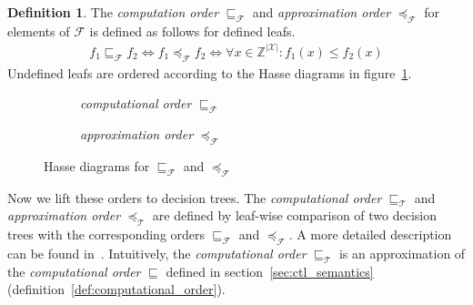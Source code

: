 \documentclass[11pt,a4paper,titlepage]{article}
\theoremstyle{definition}
\newtheorem{definition}{Definition}[section]
\begin{document}
\begin{definition}\label{def:fun_comp_approx_order}
    The \textit{computation order} $\sqsubseteq_{\mathcal{F}}$ and \textit{approximation order} $\preceq_{\mathcal{F}}$
    for elements of $\mathcal{F}$ is defined as follows for defined leafs.
    \begin{align*}
        f_1 \sqsubseteq_{\mathcal{F}} f_2  \iff  f_1 \preceq_{\mathcal{F}} f_2 \iff
        \forall x \in \mathbb{Z}^{|\mathcal{X}|} \colon f_1(x) \leq f_2(x)
    \end{align*}
    Undefined leafs are ordered according to the Hasse diagrams in figure~\ref{fig:function_comp_approx_hasse}. 
\end{definition}


\begin{figure}
    \begin{subfigure}[b]{0.5\textwidth}
        \centering
        \caption{\textit{computational order} $\sqsubseteq_{\mathcal{F}}$}
    \end{subfigure}
    \begin{subfigure}[b]{0.5\textwidth}
        \centering
        \caption{\textit{approximation order} $\preceq_{\mathcal{F}}$}
    \end{subfigure}
    \caption{Hasse diagrams for $\sqsubseteq_{\mathcal{F}}$ and $\preceq_{\mathcal{F}}$
    } 
    \label{fig:function_comp_approx_hasse}
\end{figure}

Now we lift these orders to decision trees. The \textit{computational order} $\sqsubseteq_{\mathcal{T}}$ 
and \textit{approximation order} $\preceq_{\mathcal{T}}$ are defined by leaf-wise comparison of two decision trees with the corresponding orders 
$\sqsubseteq_{\mathcal{F}}$ and $\preceq_{\mathcal{F}}$. A more detailed description can be found in~\cite{UrbanPhd}. 
Intuitively, the \textit{computational order} $\sqsubseteq_{\mathcal{T}}$ is an approximation of the \textit{computational order} $\sqsubseteq$ defined 
in section~\ref{sec:ctl_semantics} (definition~\ref{def:computational_order}).\\
\end{document}
